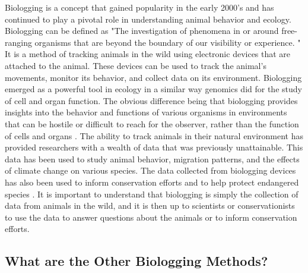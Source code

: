 \documentclass[sigplan,screen,nonacm]{acmart}
\begin{document}
Biologging is a concept that gained popularity in the early 2000's and has continued
to play a pivotal role in understanding animal behavior and ecology. Biologging can be
defined as "The investigation of phenomena in or around free-ranging organisms that are beyond
the boundary of our visibility or experience. \cite{boyd2004bio}"
It is a method of tracking animals in the wild using electronic devices that are
attached to the animal. These devices can be used to track the animal's
movements, monitor its behavior, and collect data on its environment. Biologging
emerged as a powerful tool in ecology in a similar way genomics did for the study
of cell and organ function. The obvious difference being that biologging provides
insights into the behavior and functions of various organisms in environments that
can be hostile or difficult to reach for the observer, rather than the function of cells and
organs \cite{boyd2004bio}. The ability to track animals in their natural environment has
provided researchers with a wealth of data that was previously unattainable. This data
has been used to study animal behavior, migration patterns, and the effects of climate change
on various species\cite{10.3389/fevo.2018.00092}. The data collected from biologging
devices has also been used to inform conservation efforts and to help protect endangered
species \cite{cooke2008biotelemetry}. It is important to understand that biologging is
simply the collection of data from animals in the wild, and it is then up to scientists
or conservationists to use the data to answer questions about the animals or to inform
conservation efforts.

\subsection{What are the Other Biologging Methods?}
\label{subsec:What are the Other Biologging Methods?}
\end{document}
